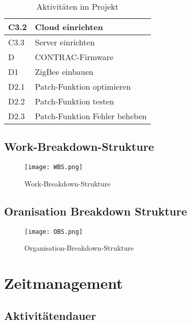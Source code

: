 \begin{table}[H]
\begin{center}
\begin{tabular}{l|l}
            C3.2 & Cloud einrichten      \\ \hline
            C3.3 & Server einrichten     \\ \hline
            D    & CONTRAC-Firmware      \\ \hline
            D1   & ZigBee einbauen       \\ \hline
            D2.1 & Patch-Funktion optimieren \\ \hline
            D2.2 & Patch-Funktion testen \\ \hline
            D2.3 & Patch-Funktion Fehler beheben  \\
        \end{tabular}
        \caption{Aktivitäten im Projekt}
    \end{center}
\end{table}

\subsection{Work-Breakdown-Strukture}
\begin{figure}[H]
    \begin{center}
        \texttt{[image: WBS.png]}
    \end{center}
    \caption{Work-Breakdown-Strukture}
\end{figure}
\subsection{Oranisation Breakdown Strukture}
\begin{figure}[H]
    \begin{center}
        \texttt{[image: OBS.png]}
    \end{center}
    \caption{Organisation-Breakdown-Strukture}
\end{figure}
\section{Zeitmanagement}
\subsection{Aktivitätendauer}

